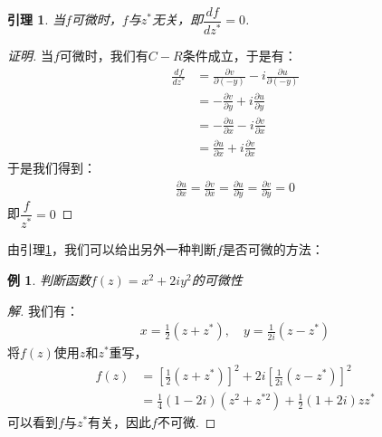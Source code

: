 \documentclass[12pt, a4paper]{ctexbook}
\newtheorem{lemma}{引理}[chapter] %
\newtheorem{example}{例}[chapter] %
\begin{document}
                \begin{lemma}
                    \label{lem:complex_function_differentiable_with_respect_to_z}
                    当$f$可微时，$f$与$z^*$无关，即$\dfrac{df}{dz^*} = 0$.
                \end{lemma}
                \begin{proof}[证明]
                    当$f$可微时，我们有$C-R$条件成立，于是有：
                    \allowdisplaybreaks
                    \begin{align*}
                        \frac{df}{dz^*} &= \frac{\partial v}{\partial (-y)} - i \frac{\partial u}{\partial (-y)}\\
                        &= -\frac{\partial v}{\partial y} + i \frac{\partial u}{\partial y}\\
                        &= -\frac{\partial u}{\partial x} - i \frac{\partial v}{\partial x}\\
                        &= \frac{\partial u}{\partial x} + i \frac{\partial v}{\partial x}
                    \end{align*}
                    于是我们得到：
                    \begin{align*}
                        \frac{\partial u}{\partial x} = \frac{\partial v}{\partial x} = \frac{\partial u}{\partial y} = \frac{\partial v}{\partial y} = 0
                    \end{align*}
                    即$\dfrac{f}{z^*} = 0$
                \end{proof}
                由引理\ref{lem:complex_function_differentiable_with_respect_to_z}，我们可以给出另外一种判断$f$是否可微的方法：
                \begin{example}
                    判断函数$f(z) = x^2 +2iy^2$的可微性
                \end{example}
                \begin{proof}[解]
                    我们有：
                    \begin{align*}
                        x = \frac{1}{2}(z + z^*), \quad y = \frac{1}{2i}(z - z^*)
                    \end{align*}
                    将$f(z)$使用$z$和$z^*$重写，
                    \begin{align*}
                        f(z) &= [\frac{1}{2}(z + z^*)]^2 + 2i[\frac{1}{2i}(z - z^*)]^2\\
                        &= \frac{1}{4}(1 - 2i)(z^2 + z^{*2}) + \frac{1}{2}(1 + 2i)zz^*
                    \end{align*}
                    可以看到$f$与$z^*$有关，因此$f$不可微.
                \end{proof}
\end{document}

